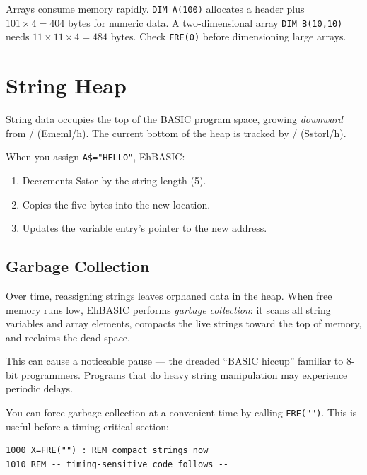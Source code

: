 \begin{warningbox}
Arrays consume memory rapidly.  \texttt{DIM A(100)} allocates a header plus
$101 \times 4 = 404$ bytes for numeric data.  A two-dimensional array
\texttt{DIM B(10,10)} needs $11 \times 11 \times 4 = 484$ bytes.  Check
\texttt{FRE(0)} before dimensioning large arrays.
\end{warningbox}

\section{String Heap}

String data occupies the top of the BASIC program space, growing
\emph{downward} from / (Ememl/h).  The current bottom
of the heap is tracked by / (Sstorl/h).

When you assign \texttt{A\$="HELLO"}, EhBASIC:
\begin{enumerate}
  \item Decrements Sstor by the string length (5).
  \item Copies the five bytes into the new location.
  \item Updates the variable entry's pointer to the new address.
\end{enumerate}

\subsection{Garbage Collection}

Over time, reassigning strings leaves orphaned data in the heap.  When free
memory runs low, EhBASIC performs \emph{garbage collection}: it scans all
string variables and array elements, compacts the live strings toward the top
of memory, and reclaims the dead space.

This can cause a noticeable pause --- the dreaded ``BASIC hiccup'' familiar
to 8-bit programmers.  Programs that do heavy string manipulation may
experience periodic delays.

\begin{tipbox}
You can force garbage collection at a convenient time by calling
\texttt{FRE("")}.  This is useful before a timing-critical section:
\begin{lstlisting}
1000 X=FRE("") : REM compact strings now
1010 REM -- timing-sensitive code follows --
\end{lstlisting}
\end{tipbox}


